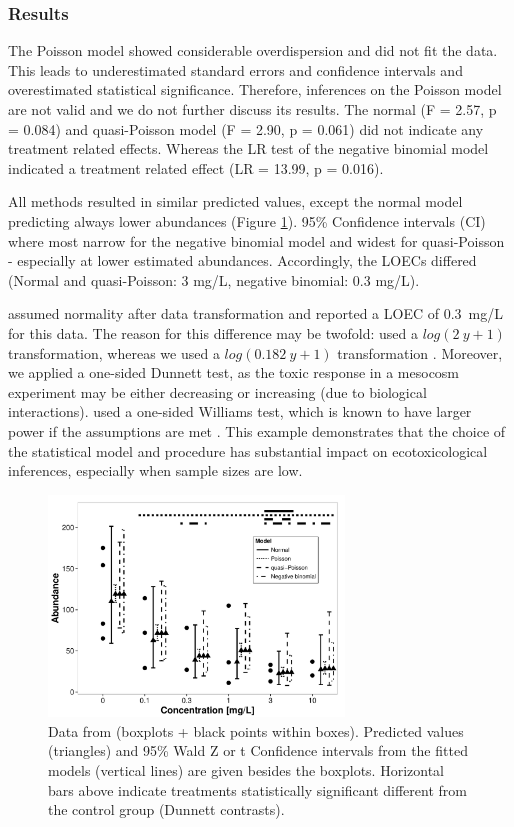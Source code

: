 \documentclass{scrartcl}
\begin{document}
\subsubsection{Results}
The Poisson model showed considerable overdispersion and did not fit the data. 
This leads to underestimated standard errors and confidence intervals and overestimated statistical significance.
Therefore, inferences on the Poisson model are not valid and we do not further discuss its results.
The normal (F = 2.57, p = 0.084) and quasi-Poisson model (F = 2.90, p = 0.061) did not indicate any treatment related effects.
Whereas the LR test of the negative binomial model indicated a treatment related effect (LR = 13.99, p = 0.016).

All methods resulted in similar predicted values, except the normal model predicting always lower abundances (Figure \ref{fig:example}). 
95\% Confidence intervals (CI) where most narrow for the negative binomial model and widest for quasi-Poisson - especially at lower estimated abundances.
Accordingly, the LOECs differed (Normal and quasi-Poisson: 3 mg/L, negative binomial: 0.3 mg/L).

\citet{brock_minimum_2015} assumed normality after data transformation and reported a LOEC of \mbox{0.3 mg/L} for this data.
The reason for this difference may be twofold: \citep{brock_minimum_2015} used a $log(2~y + 1)$ transformation, whereas we used a $log(0.182~y + 1)$ transformation \citep{van_den_brink_impact_2000}.
Moreover, we applied a one-sided Dunnett test, as the toxic response in a mesocosm experiment may be either decreasing or increasing (due to biological interactions).
\citet{brock_minimum_2015} used a one-sided Williams test, which is known to have larger power if the assumptions are met \citep{jaki_statistical_2013}.
This example demonstrates that the choice of the statistical model and procedure has substantial impact on ecotoxicological inferences, especially when sample sizes are low.

\begin{figure}
  \centering
  \includegraphics[width = 0.7\textwidth]{example.pdf}
  \caption{Data from \citet{brock_minimum_2015} (boxplots + black points within boxes). 
  Predicted values (triangles) and 95\% Wald Z or t Confidence intervals from the fitted models (vertical lines) are given besides the boxplots.
  Horizontal bars above indicate treatments statistically significant different from the control group (Dunnett contrasts).}
  \label{fig:example}
\end{figure}
\end{document}
